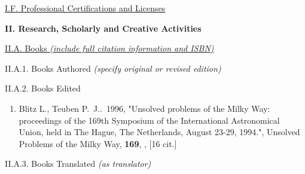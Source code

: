 \documentclass[11pt,letterpaper]{article}
\begin{document}
\underline{I.F. Professional Certifications and Licenses}


\textbf{II. Research, Scholarly and Creative Activities}

% 

\noindent\underline{II.A. Books \textit{(include full citation information and ISBN)}}

II.A.1. Books Authored \textit{(specify original or revised edition)}

II.A.2. Books Edited

\begin{enumerate}[resume,label=\textbf{\arabic*}.]

\item  Blitz L., Teuben P.~J..\  1996,  "Unsolved problems of the Milky 
Way: proceedings of the 169th Symposium of the International Astronomical 
Union, held in The Hague, The Netherlands, August 23-29, 1994.", Unsolved 
Problems of the Milky Way,  {\bf 169}, ,  [16 cit.] %

\end{enumerate}


II.A.3. Books Translated \textit{(as translator)}
\end{document}
